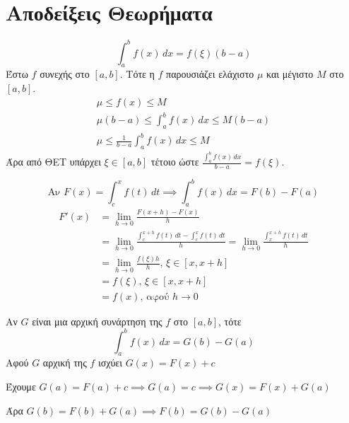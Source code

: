 \documentclass{../presentation}
\begin{document}
\appendix

\section{Αποδείξεις Θεωρήματα}

\begin{apodiksi}
  $$\int_a^b f(x)\,dx = f(ξ)(b-a)$$
  Έστω $f$ συνεχής στο $[a,b]$. Τότε η $f$ παρουσιάζει ελάχιστο $μ$ και μέγιστο $Μ$ στο $[a,b]$. \pause
  \begin{gather*}
    μ\le f(x) \le Μ                        \\
    μ(b-a)\le \int_a^b f(x)\,dx \le Μ(b-a) \\
    μ \le \frac{1}{b-a}\int_a^b f(x)\,dx \le Μ
  \end{gather*}
  Άρα από ΘΕΤ υπάρχει $ξ\in [a,b]$ τέτοιο ώστε $\frac{\int_a^b f(x)\,dx}{b-a} = f(ξ)$.
\end{apodiksi}

\begin{apodiksi}[Αρχική = Ορισμένο Ολοκλήρωμα]
  $$\text{Αν } F(x)=\int_c^x f(t)\,dt \implies \int_a^b f(x)\,dx = F(b)-F(a)$$
  \begin{align*}
    F'(x) & =\lim_{h\to 0}\frac{F(x+h)-F(x)}{h}                                                                         \\
          & =\lim_{h\to 0}\frac{\int_c^{x+h}f(t)\,dt-\int_c^x f(t)\,dt}{h} =\lim_{h\to 0}\frac{\int_x^{x+h}f(t)\,dt}{h} \\
          & =\lim_{h\to 0}\frac{f(ξ)h}{h} \text{, } ξ\in [x,x+h]                                                        \\
          & =f(ξ) \text{, } ξ\in [x,x+h]                                                                                \\
          & =f(x) \text{, } \text{αφού } h\to 0
  \end{align*}
\end{apodiksi}

\begin{apodiksi}
  Αν $G$ είναι μια αρχική συνάρτηση της $f$ στο $[a,b]$, τότε
  $$\int_a^b f(x)\,dx = G(b)-G(a)$$
  Αφού $G$ αρχική της $f$ ισχύει $G(x) =F(x)+c$

  Έχουμε $G(a)=F(a)+c\implies G(a)=c \implies G(x)=F(x)+G(a)$

  Άρα    $G(b) =F(b)+G(a) \implies F(b)=G(b)-G(a)$

\end{apodiksi}
\end{document}
